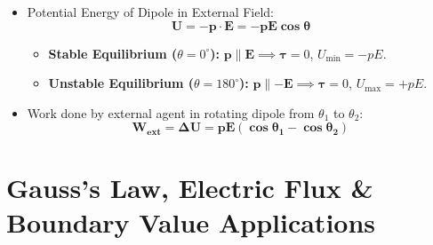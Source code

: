 \documentclass[10pt,twoside,openright]{book}
\begin{document}
\begin{formulabox}
\begin{itemize}
\begin{equation}
    \mathbf{\boldsymbol{\tau} = \mathbf{p} \times \mathbf{E}} \implies |\boldsymbol{\tau}| = p E \sin\theta
  \end{equation}
  Maximum torque occurs at $\theta = 90^\circ$ ($\tau_{\max} = pE$).
  \item Potential Energy of Dipole in External Field:
  \begin{equation}
    \mathbf{U = -\mathbf{p}\cdot\mathbf{E} = -p E \cos\theta}
  \end{equation}
  \begin{itemize}
    \item \textbf{Stable Equilibrium ($\theta = 0^\circ$):} $\mathbf{p} \parallel \mathbf{E} \implies \boldsymbol{\tau} = 0$, $U_{\min} = -pE$.
    \item \textbf{Unstable Equilibrium ($\theta = 180^\circ$):} $\mathbf{p} \parallel -\mathbf{E} \implies \boldsymbol{\tau} = 0$, $U_{\max} = +pE$.
  \end{itemize}
  \item Work done by external agent in rotating dipole from $\theta_1$ to $\theta_2$:
  \begin{equation}
    \mathbf{W_{\text{ext}} = \Delta U = p E (\cos\theta_1 - \cos\theta_2)}
  \end{equation}
\end{itemize}
\end{formulabox}

\section{Gauss's Law, Electric Flux \& Boundary Value Applications}
\end{document}
